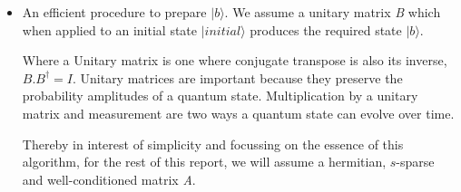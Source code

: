 \documentclass[12pt]{article}
\begin{document}
\begin{itemize}
    \item An efficient procedure to prepare $|b\rangle$. We assume a unitary matrix \emph{B} which when applied to an initial state $|initial\rangle$ produces the required state $|b\rangle$.
    
    Where a Unitary matrix is one where conjugate transpose is also its inverse, $B.B^\dagger = I$. Unitary matrices are important because they preserve the probability amplitudes of a quantum state. Multiplication by a unitary matrix and measurement are two ways a quantum state can evolve over time.
    
    Thereby in interest of simplicity and focussing on the essence of this algorithm, for the rest of this report, we will assume a hermitian, $s$-sparse and well-conditioned matrix \emph{A}.
\end{itemize}
\end{document}
